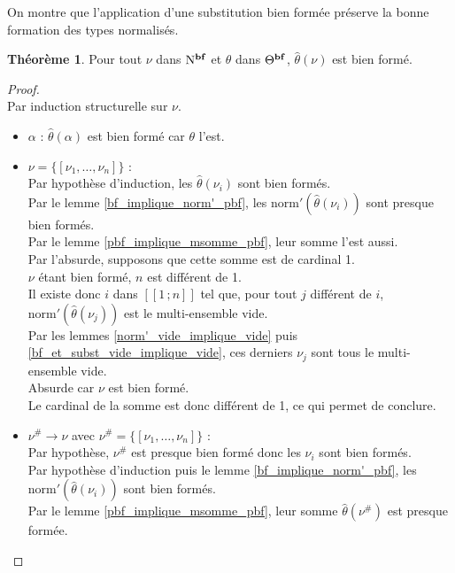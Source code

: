 \documentclass[a4paper]{report}
\newenvironment{preuve} 
  {\begin{proof}~\\} 
  {\end{proof}}
\theoremstyle{definition}
\newtheorem{theoreme}{Théorème}
\newcommand{\interval}[2]{[\![#1\,;#2]\!]}
\newcommand{\mset}[1]{\{\![#1]\!\}}
\newcommand{\norm}{\mathrm{norm}}
\newcommand{\N}{\mathrm{N}}
\begin{document}
On montre que l'application d'une substitution bien formée préserve la bonne formation des types normalisés.

\begin{theoreme} \label{bf_implique_subst_bf}
  Pour tout $\nu$ dans $\N^{\bold{bf}}$ et $\theta$ dans $\Theta^{\bold{bf}}$, $\hat\theta (\nu)$ est bien formé.
\end{theoreme}

\begin{preuve}
  Par induction structurelle sur $\nu$.
  \begin{itemize}[label={\textbf{Cas}}]
    \item
      $\alpha$ : $\hat\theta (\alpha)$ est bien formé car $\theta$ l'est.
    \item
      $\nu = \mset{\nu_1, \dots, \nu_n}$ : \\
      Par hypothèse d'induction, les $\hat\theta (\nu_i)$ sont bien formés. \\
      Par le lemme \ref{bf_implique_norm'_pbf}, les $\norm' (\hat\theta (\nu_i))$ sont presque bien formés. \\
      Par le lemme \ref{pbf_implique_msomme_pbf}, leur somme l'est aussi. \\
      Par l'absurde, supposons que cette somme est de cardinal 1. \\
      $\nu$ étant bien formé, $n$ est différent de 1. \\
      Il existe donc $i$ dans $\interval 1 n$ tel que, pour tout $j$ différent de $i$, $\norm' (\hat\theta (\nu_j))$ est le multi-ensemble vide. \\
      Par les lemmes \ref{norm'_vide_implique_vide} puis \ref{bf_et_subst_vide_implique_vide}, ces derniers $\nu_j$ sont tous le multi-ensemble vide. \\
      Absurde car $\nu$ est bien formé. \\
      Le cardinal de la somme est donc différent de 1, ce qui permet de conclure.
    \item
      $\nu^\# \rightarrow \nu$ avec $\nu^\# = \mset{\nu_1, \dots, \nu_n}$ : \\
      Par hypothèse, $\nu^\#$ est presque bien formé donc les $\nu_i$ sont bien formés. \\
      Par hypothèse d'induction puis le lemme \ref{bf_implique_norm'_pbf}, les $\norm' (\hat\theta (\nu_i))$ sont bien formés. \\
      Par le lemme \ref{pbf_implique_msomme_pbf}, leur somme $\hat\theta (\nu^\#)$ est presque formée. \\

\end{itemize}
\end{preuve}
\end{document}
